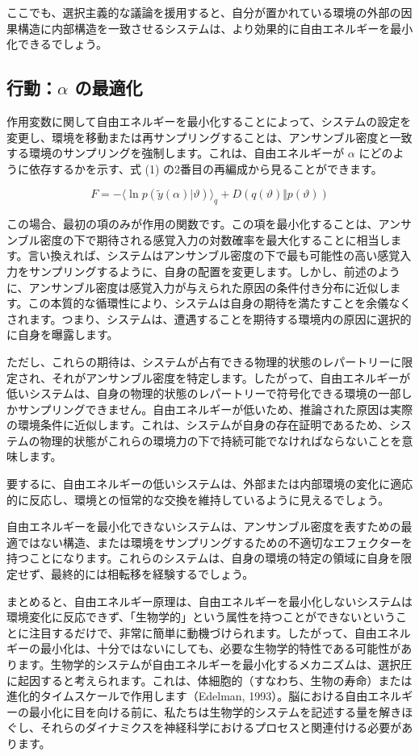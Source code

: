 \documentclass{article}
\begin{document}
ここでも、選択主義的な議論を援用すると、自分が置かれている環境の外部の因果構造に内部構造を一致させるシステムは、より効果的に自由エネルギーを最小化できるでしょう。

\subsection{行動：$\alpha$ の最適化}
作用変数に関して自由エネルギーを最小化することによって、システムの設定を変更し、環境を移動または再サンプリングすることは、アンサンブル密度と一致する環境のサンプリングを強制します。これは、自由エネルギーが $\alpha$ にどのように依存するかを示す、式 (1) の2番目の再編成から見ることができます。

$$F = -\langle\ln p(\tilde{y}(\alpha)|\vartheta)\rangle_q+D(q(\vartheta)\Vert p(\vartheta))$$

この場合、最初の項のみが作用の関数です。この項を最小化することは、アンサンブル密度の下で期待される感覚入力の対数確率を最大化することに相当します。言い換えれば、システムはアンサンブル密度の下で最も可能性の高い感覚入力をサンプリングするように、自身の配置を変更します。しかし、前述のように、アンサンブル密度は感覚入力が与えられた原因の条件付き分布に近似します。この本質的な循環性により、システムは自身の期待を満たすことを余儀なくされます。つまり、システムは、遭遇することを期待する環境内の原因に選択的に自身を曝露します。

ただし、これらの期待は、システムが占有できる物理的状態のレパートリーに限定され、それがアンサンブル密度を特定します。したがって、自由エネルギーが低いシステムは、自身の物理的状態のレパートリーで符号化できる環境の一部しかサンプリングできません。自由エネルギーが低いため、推論された原因は実際の環境条件に近似します。これは、システムが自身の存在証明であるため、システムの物理的状態がこれらの環境力の下で持続可能でなければならないことを意味します。

要するに、自由エネルギーの低いシステムは、外部または内部環境の変化に適応的に反応し、環境との恒常的な交換を維持しているように見えるでしょう。

自由エネルギーを最小化できないシステムは、アンサンブル密度を表すための最適ではない構造、または環境をサンプリングするための不適切なエフェクターを持つことになります。これらのシステムは、自身の環境の特定の領域に自身を限定せず、最終的には相転移を経験するでしょう。

まとめると、自由エネルギー原理は、自由エネルギーを最小化しないシステムは環境変化に反応できず、「生物学的」という属性を持つことができないということに注目するだけで、非常に簡単に動機づけられます。したがって、自由エネルギーの最小化は、十分ではないにしても、必要な生物学的特性である可能性があります。生物学的システムが自由エネルギーを最小化するメカニズムは、選択圧に起因すると考えられます。これは、体細胞的（すなわち、生物の寿命）または進化的タイムスケールで作用します（Edelman, 1993）。脳における自由エネルギーの最小化に目を向ける前に、私たちは生物学的システムを記述する量を解きほぐし、それらのダイナミクスを神経科学におけるプロセスと関連付ける必要があります。
\end{document}
